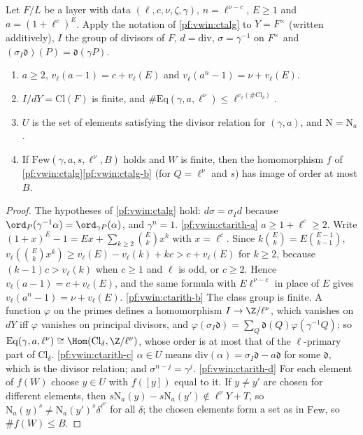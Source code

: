\begin{lemma}\label{pf:vwin:ctarith}
Let $F/L$ be a layer with data $(\ell,c,\nu,\zeta,\gamma)$, $n=\ell^{\nu-c}$, $E\ge1$ and $a=(1+\ell^c)^E$. Apply the notation of
\cref{pf:vwin:ctalg} to $Y=F^\times$ (written additively), $I$ the group of divisors of $F$, $d=\mathrm{div}$, $\sigma=\gamma^{-1}$
on $F^\times$ and $(\sigma_I\mathfrak d)(P)=\mathfrak d(\gamma P)$.
\begin{enumerate}[label=(\alph*)]
\item\label{pf:vwin:ctarith-a} $a\ge2$, $v_\ell(a-1)=c+v_\ell(E)$ and $v_\ell(a^n-1)=\nu+v_\ell(E)$.
\item\label{pf:vwin:ctarith-b} $I/dY=\mathrm{Cl}(F)$ is finite, and $\#\mathrm{Eq}(\gamma,a,\ell^\nu)\le\ell^{v_\ell(\#\mathrm{Cl}_\delta)}$.
\item\label{pf:vwin:ctarith-c} $U$ is the set of elements satisfying the divisor relation for $(\gamma,a)$, and $\mathrm N=\mathrm N_a$.
\item\label{pf:vwin:ctarith-d} If $\mathrm{Few}(\gamma,a,s,\ell^\nu,B)$ holds and $W$ is finite, then the homomorphism $f$ of
\cref{pf:vwin:ctalg}\ref{pf:vwin:ctalg-b} (for $Q=\ell^\nu$ and $s$) has image of order at most $B$.
\end{enumerate}
\end{lemma}

\begin{proof}
The hypotheses of \cref{pf:vwin:ctalg} hold: $d\sigma=\sigma_Id$ because $\ord_P(\gamma^{-1}\alpha)=\ord_{\gamma P}(\alpha)$, and
$\gamma^n=1$.
\ref{pf:vwin:ctarith-a} $a\ge1+\ell^c\ge2$. Write $(1+x)^E-1=Ex+\sum_{k\ge2}\binom Ekx^k$ with $x=\ell^c$. Since $k\binom Ek=E\binom{E-1}{k-1}$,
$v_\ell(\binom Ekx^k)\ge v_\ell(E)-v_\ell(k)+kc>c+v_\ell(E)$ for $k\ge2$, because $(k-1)c>v_\ell(k)$ when $c\ge1$ and $\ell$ is odd, or
$c\ge2$. Hence $v_\ell(a-1)=c+v_\ell(E)$, and the same formula with $E\ell^{\nu-c}$ in place of $E$ gives $v_\ell(a^n-1)=\nu+v_\ell(E)$.
\ref{pf:vwin:ctarith-b} The class group is finite. A function $\varphi$ on the primes defines a homomorphism $I\to\Z/\ell^\nu$, which
vanishes on $dY$ iff $\varphi$ vanishes on principal divisors, and $\varphi(\sigma_I\mathfrak d)=\sum_Q\mathfrak d(Q)\varphi(\gamma^{-1}Q)$;
so $\mathrm{Eq}(\gamma,a,\ell^\nu)\cong\Hom(\mathrm{Cl}_\delta,\Z/\ell^\nu)$, whose order is at most that of the $\ell$-primary part of
$\mathrm{Cl}_\delta$.
\ref{pf:vwin:ctarith-c} $\alpha\in U$ means $\mathrm{div}(\alpha)=\sigma_I\mathfrak d-a\mathfrak d$ for some $\mathfrak d$, which is the
divisor relation; and $\sigma^{n-j}=\gamma^j$.
\ref{pf:vwin:ctarith-d} For each element of $f(W)$ choose $y\in U$ with $f([y])$ equal to it. If $y\ne y'$ are chosen for different
elements, then $s\mathrm N_a(y)-s\mathrm N_a(y')\notin\ell^\nu Y+T$, so $\mathrm N_a(y)^s\ne\mathrm N_a(y')^s\delta^{\ell^\nu}$ for all
$\delta$; the chosen elements form a set as in $\mathrm{Few}$, so $\#f(W)\le B$.
\end{proof}

